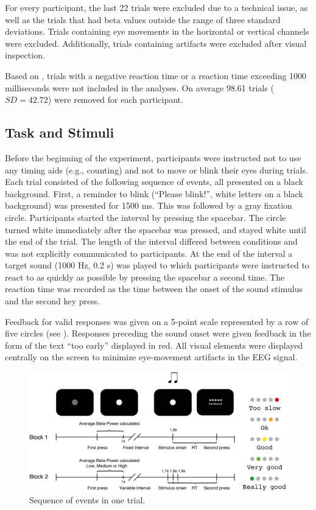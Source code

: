 \documentclass[man,floatsintext]{apa6} %
\begin{document}
For every participant, the last 22 trials were excluded due to a
technical issue, as well as the trials that had beta values outside
the range of three standard deviations. Trials containing eye
movements in the horizontal or vertical channels were
excluded. Additionally, trials containing artifacts were excluded after
visual inspection.

Based on , trials with a negative reaction
time or a reaction time exceeding 1000 milliseconds were not included
in the analyses. On average 98.61 trials ($SD = 42.72$) were removed
for each participant.

\subsection{Task and Stimuli}
Before the beginning of the experiment, participants were instructed
not to use any timing aids (e.g., counting) and not to move or blink
their eyes during trials. Each trial consisted of the following
sequence of events, all presented on a black background. First, a
reminder to blink (``Please blink!'', white letters on a black
background) was presented for 1500 ms. This was followed by a gray
fixation circle. Participants started the interval by pressing the
spacebar. The circle turned white immediately after the spacebar was
pressed, and stayed white until the end of the trial. The length of
the interval differed between conditions and was not explicitly
communicated to participants. At the end of the interval a target
sound (1000 Hz, 0.2 s) was played to which participants were
instructed to react to as quickly as possible by pressing the spacebar
a second time. The reaction time was recorded as the time between the
onset of the sound stimulus and the second key press.

Feedback for valid responses was given on a 5-point scale represented
by a row of five circles (see ). Responses preceding
the sound onset were given feedback in the form of the text ``too
early'' displayed in red. All visual elements were displayed centrally
on the screen to minimize eye-movement artifacts in the EEG signal.

\begin{figure}[!h]
  \includegraphics[width=\textwidth]{trial}
  \caption{Sequence of events in one trial.}
  \label{fig:task}
\end{figure}
\end{document}
